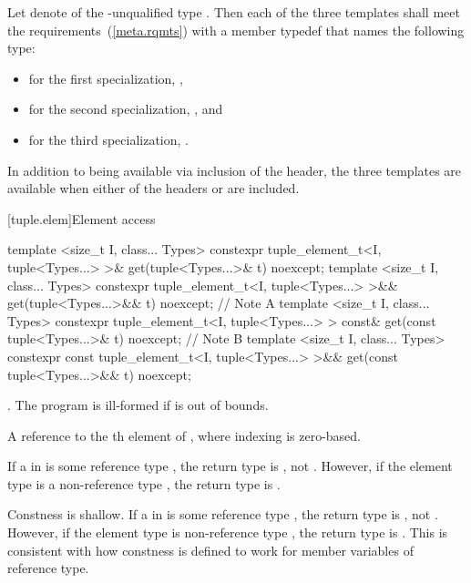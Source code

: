 \begin{itemdescr}
\pnum
Let  denote  of the \cv-unqualified type . Then
each of the three templates shall meet the 
requirements~(\ref{meta.rqmts}) with a member typedef  that names the following
type:

\begin{itemize}
\item
for the first specialization, ,
\item
for the second specialization, , and
\item
for the third specialization, .
\end{itemize}

\pnum
In addition to being available via inclusion of the  header,
the three templates are available when either of the headers  or
 are included.
\end{itemdescr}

[tuple.elem]{Element access}

%
%
\begin{itemdecl}
template <size_t I, class... Types>
  constexpr tuple_element_t<I, tuple<Types...> >& get(tuple<Types...>& t) noexcept;
template <size_t I, class... Types>
  constexpr tuple_element_t<I, tuple<Types...> >&& get(tuple<Types...>&& t) noexcept; // Note A
template <size_t I, class... Types>
  constexpr tuple_element_t<I, tuple<Types...> > const& get(const tuple<Types...>& t) noexcept; // Note B
template <size_t I, class... Types>
  constexpr const tuple_element_t<I, tuple<Types...> >&& get(const tuple<Types...>&& t) noexcept; 
\end{itemdecl}

\begin{itemdescr}
\pnum
\requires {}.
The program is ill-formed if  is out of bounds.

\pnum
\returns  A reference to the th element of , where
indexing is zero-based.

\pnum
{}
If a  in  is some reference type ,
the return type is , not .
However, if the element type is a non-reference type ,
the return type is .
{}

\pnum
{}
Constness is shallow. If a 
in  is some
reference type , the return type is , not .
However, if the element type is non-reference type , the return
type is .
This is consistent with how constness is defined to work
for member variables of reference type.
{}
\end{itemdescr}

